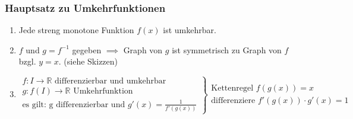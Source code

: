 \subsubsection*{Hauptsatz zu Umkehrfunktionen}
\begin{enumerate}
    \item Jede streng monotone Funktion $f(x)$ ist umkehrbar.
    \item $f$ und $g=f^{-1}$ gegeben $\implies$ Graph von $g$ ist symmetrisch zu Graph von $f$ bzgl. $y=x$. (siehe Skizzen)
    \item
        $
            \left.
            \begin{array}{l}
            f:I \to \mathbb{R} \text{ differenzierbar und umkehrbar}\\
            g:f(I) \to \mathbb{R} \text{ Umkehrfunktion}\\
            \text{es gilt: g differenzierbar und } g'(x) = \frac{1}{f'(g(x))}
            \end{array}
            \right\}
            \begin{array}{l}
            \text{Kettenregel } f(g(x)) = x\\
            \text{differenziere } f'(g(x)) \cdot g'(x) = 1
            \end{array}
        $
\end{enumerate}

